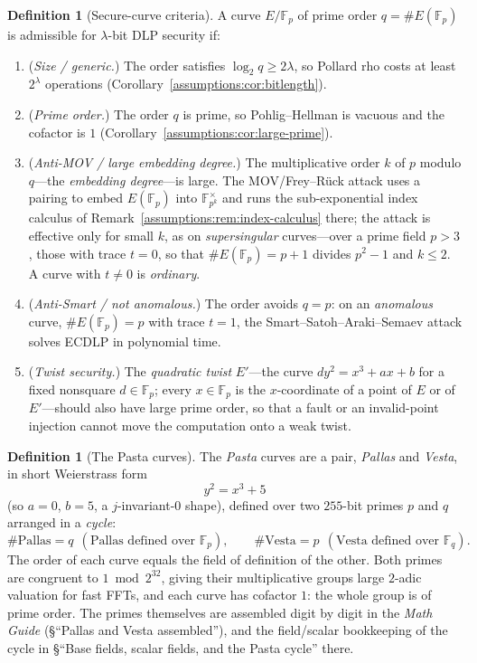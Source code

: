 \documentclass[11pt,a4paper]{article}
\theoremstyle{definition}
\newtheorem{definition}[theorem]{Definition}
\theoremstyle{remark}
\newcommand{\F}{\ensuremath{\mathbb{F}}}
\newcommand{\Fp}{\ensuremath{\mathbb{F}_{p}}}
\newcommand{\Fq}{\ensuremath{\mathbb{F}_{q}}}
\begin{document}
\begin{definition}[Secure-curve criteria]
\label{assumptions:def:secure-curve}
A curve \(E/\Fp\) of prime order \(q = \#E(\Fp)\) is admissible for
\(\lambda\)-bit DLP security if:
\begin{enumerate}
\item (\emph{Size / generic.}) The order satisfies
  \(\log_2 q \ge 2\lambda\), so Pollard rho costs at least
  \(2^{\lambda}\) operations
  (Corollary~\ref{assumptions:cor:bitlength}).
\item (\emph{Prime order.}) The order \(q\) is prime, so
  Pohlig--Hellman is vacuous and the cofactor is \(1\)
  (Corollary~\ref{assumptions:cor:large-prime}).
\item (\emph{Anti-MOV / large embedding degree.}) The multiplicative
  order \(k\) of \(p\) modulo \(q\)---the \emph{embedding
  degree}---is large. The MOV/Frey--R\"uck attack uses a pairing to
  embed \(E(\Fp)\) into \(\F_{p^{k}}^{\times}\) and runs the
  sub-exponential index calculus of
  Remark~\ref{assumptions:rem:index-calculus} there; the attack is
  effective only for small \(k\), as on \emph{supersingular} curves---over
  a prime field \(p > 3\), those with trace \(t = 0\), so that
  \(\#E(\Fp) = p + 1\) divides \(p^{2} - 1\) and \(k \le 2\). A curve
  with \(t \ne 0\) is \emph{ordinary}.
\item (\emph{Anti-Smart / not anomalous.}) The order avoids
  \(q = p\): on an \emph{anomalous} curve, \(\#E(\Fp) = p\) with
  trace \(t = 1\), the Smart--Satoh--Araki--Semaev attack solves
  ECDLP in polynomial time.
\item (\emph{Twist security.}) The \emph{quadratic twist} \(E'\)---the
  curve \(d y^{2} = x^{3} + ax + b\) for a fixed nonsquare
  \(d \in \Fp\); every \(x \in \Fp\) is the \(x\)-coordinate of a
  point of \(E\) or of \(E'\)---should also have large prime order,
  so that a fault or an invalid-point injection cannot move the
  computation onto a weak twist.
\end{enumerate}
\end{definition}

\begin{definition}[The Pasta curves]
\label{assumptions:def:pasta}
The \emph{Pasta} curves are a pair, \emph{Pallas} and \emph{Vesta},
in short Weierstrass form
\[
y^{2} = x^{3} + 5
\]
(so \(a = 0\), \(b = 5\), a \(j\)-invariant-\(0\) shape), defined over
two \(255\)-bit primes \(p\) and \(q\) arranged in a \emph{cycle}:
\[
\#\mathrm{Pallas} = q
  \ \ (\text{Pallas defined over } \Fp),
\qquad
\#\mathrm{Vesta} = p
  \ \ (\text{Vesta defined over } \Fq).
\]
The order of each curve equals the field of definition of the other.
Both primes are congruent to \(1 \bmod 2^{32}\), giving their
multiplicative groups large \(2\)-adic valuation for fast FFTs, and
each curve has cofactor \(1\): the whole group is of prime order. The
primes themselves are assembled digit by digit in the
\emph{Math Guide} (\S``Pallas and Vesta assembled''), and the
field/scalar bookkeeping of the cycle in \S``Base fields, scalar
fields, and the Pasta cycle'' there.
\end{definition}
\end{document}

